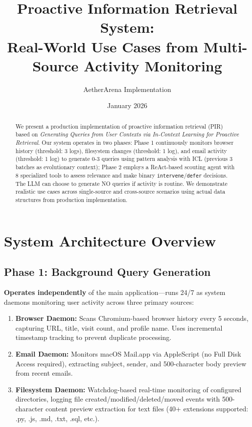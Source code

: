 \documentclass[11pt,a4paper]{article}
\title{\textbf{Proactive Information Retrieval System:} \\
\large Real-World Use Cases from Multi-Source Activity Monitoring}
\author{AetherArena Implementation}
\date{January 2026}
\begin{document}
\maketitle

\begin{abstract}
We present a production implementation of proactive information retrieval (PIR) based on \textit{Generating Queries from User Contexts via In-Context Learning for Proactive Retrieval}. Our system operates in two phases: Phase 1 continuously monitors browser history (threshold: 3 logs), filesystem changes (threshold: 1 log), and email activity (threshold: 1 log) to generate 0-3 queries using pattern analysis with ICL (previous 3 batches as evolutionary context); Phase 2 employs a ReAct-based scouting agent with 8 specialized tools to assess relevance and make binary \texttt{intervene}/\texttt{defer} decisions. The LLM can choose to generate NO queries if activity is routine. We demonstrate realistic use cases across single-source and cross-source scenarios using actual data structures from production implementation.
\end{abstract}

\section{System Architecture Overview}

\subsection{Phase 1: Background Query Generation}
\textbf{Operates independently} of the main application—runs 24/7 as system daemons monitoring user activity across three primary sources:

\begin{enumerate}[leftmargin=*]
    \item \textbf{Browser Daemon:} Scans Chromium-based browser history every 5 seconds, capturing URL, title, visit count, and profile name. Uses incremental timestamp tracking to prevent duplicate processing.
    
    \item \textbf{Email Daemon:} Monitors macOS Mail.app via AppleScript (no Full Disk Access required), extracting subject, sender, and 500-character body preview from recent emails.
    
    \item \textbf{Filesystem Daemon:} Watchdog-based real-time monitoring of configured directories, logging file created/modified/deleted/moved events with 500-character content preview extraction for text files (40+ extensions supported: .py, .js, .md, .txt, .sql, etc.).
\end{enumerate}
\end{document}
